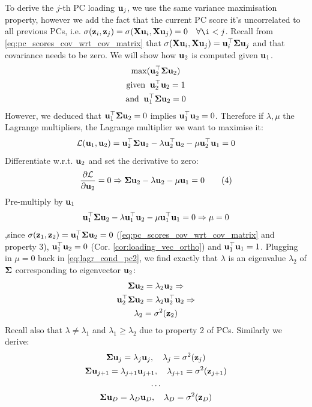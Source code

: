 \documentclass[a4paper]{article}
\begin{document}
To derive the $j$-th PC loading $\textbf{u}_j$, we use the same variance maximisation property, however we add the fact that the current PC score it's uncorrelated to all previous PCs, i.e. $\sigma(\bz_i,\bz_j)=\sigma(\bX\bu_i, \bX\bu_j) = 0 \quad \forall \i < j$. Recall from \eqref{eq:pc_scores_cov_wrt_cov_matrix} that $\sigma(\textbf{X}\textbf{u}_i,\textbf{X}\textbf{u}_j) = \textbf{u}_i^{\top}\boldsymbol{\Sigma}\textbf{u}_j$ and that covariance needs to be zero. We will show how $\textbf{u}_2$ is computed given $\textbf{u}_1$.
\begin{gather*}
    \max(\textbf{u}_2^{\top}\boldsymbol{\Sigma}\textbf{u}_2) \\
    \textup{given} \;\; \textbf{u}_2^{\top}\textbf{u}_2=1 \\
	\textup{and} \;\; \textbf{u}_1^{\top}\boldsymbol{\Sigma}\textbf{u}_2 = 0
\end{gather*}
However, we deduced that $\textbf{u}_1^{\top}\boldsymbol{\Sigma}\textbf{u}_2 = 0$ implies $\textbf{u}_1^{\top}\textbf{u}_2 = 0$. Therefore if $\lambda,\mu$ the Lagrange multipliers, the Lagrange multiplier we want to maximise it:
\[
\mathcal{L}(\textbf{u}_1,\textbf{u}_2) = \textbf{u}_2^{\top}\boldsymbol{\Sigma}\textbf{u}_2 - \lambda\textbf{u}_2^{\top}\textbf{u}_2 - \mu\textbf{u}_2^{\top}\textbf{u}_1 = 0
\]
Differentiate w.r.t. $\textbf{u}_2$ and set the derivative to zero:
\[
\frac{\partial \mathcal{L}}{\partial \textbf{u}_2} = 0 \Rightarrow \boldsymbol{\Sigma}\textbf{u}_2 - \lambda\textbf{u}_2 - \mu\textbf{u}_1 = 0 \tag{4}
\label{eq:lagr_cond_pc2}
\]
Pre-multiply by $\textbf{u}_1$
\[
\textbf{u}_1^{\top}\boldsymbol{\Sigma}\textbf{u}_2 - \lambda\textbf{u}_1^{\top}\textbf{u}_2-\mu\textbf{u}_1^{\top}\textbf{u}_1 = 0 \Rightarrow \mu = 0 
\]
,since $\sigma(\textbf{z}_1,\textbf{z}_2)= \textbf{u}_1^{\top}\boldsymbol{\Sigma}\textbf{u}_2=0$ (\eqref{eq:pc_scores_cov_wrt_cov_matrix} and property 3), $\textbf{u}_1^{\top}\textbf{u}_2=0$ (Cor. \ref{cor:loading_vec_ortho}) and $\textbf{u}_1^{\top}\textbf{u}_1=1$. Plugging in $\mu=0$ back in \eqref{eq:lagr_cond_pc2}, we find exactly that $\lambda$ is an eigenvalue  $\lambda_2$ of $\boldsymbol{\Sigma}$ corresponding to eigenvector $\textbf{u}_2$:
\begin{gather*}
    \boldsymbol{\Sigma} \textbf{u}_2 = \lambda_2\textbf{u}_2 \Rightarrow \\
    \textbf{u}_2^{\top}\boldsymbol{\Sigma} \textbf{u}_2 = \lambda_2\textbf{u}_2^{\top}\textbf{u}_2 \Rightarrow\\
    \lambda_2 = \sigma^2({\textbf{z}_2})
\end{gather*}
Recall also that $\lambda \neq \lambda_1$ and $\lambda_1 \geq \lambda_2$ due to property 2 of PCs. Similarly we derive:
\begin{gather*}
    \boldsymbol{\Sigma}\textbf{u}_j = \lambda_j \textbf{u}_j, \quad \lambda_j = \sigma^2(\textbf{z}_j) \\
        \boldsymbol{\Sigma}\textbf{u}_{j+1} = \lambda_{j+1} \textbf{u}_{j+1}, \quad \lambda_{j+1} = \sigma^2(\textbf{z}_{j+1}) \\ 
        \ldots \\
         \boldsymbol{\Sigma}\textbf{u}_D = \lambda_D \textbf{u}_D, \quad \lambda_D = \sigma^2(\textbf{z}_D)
\end{gather*}
\end{document}
